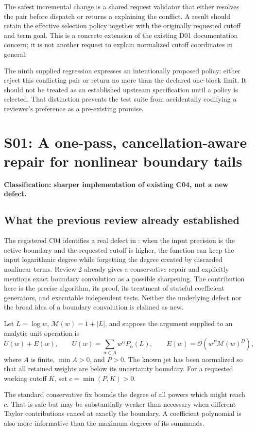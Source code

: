 \documentclass[11pt,a4paper]{article}
\newcommand{\code}[1]{\texttt{\detokenize{#1}}}
\newcommand{\OO}{\mathcal O}
\newcommand{\M}{\mathcal M}
\newcommand{\finding}[3]{\Needspace{7\baselineskip}\section{#1: #2}\textbf{Classification: #3.}\par}
\begin{document}
The safest incremental change is a shared request validator that either resolves the pair before dispatch or returns a \code{Failure} explaining the conflict. A result should retain the effective selection policy together with the originally requested cutoff and term goal. This is a concrete extension of the existing D01 documentation concern; it is not another request to explain normalized cutoff coordinates in general.

The ninth supplied regression expresses an intentionally proposed policy: either reject this conflicting pair or return no more than the declared one-block limit. It should not be treated as an established upstream specification until a policy is selected. That distinction prevents the test suite from accidentally codifying a reviewer's preference as a pre-existing promise.

\finding{S01}{A one-pass, cancellation-aware repair for nonlinear boundary tails}{sharper implementation of existing C04, not a new defect}

\subsection{What the previous review already established}
The registered C04 identifies a real defect in \code{unitSeriesPrecision}: when the input precision is the active boundary and the requested cutoff is higher, the function can keep the input logarithmic degree while forgetting the degree created by discarded nonlinear terms. Review 2 already gives a conservative repair and explicitly mentions exact boundary convolution as a possible sharpening. The contribution here is the precise algorithm, its proof, its treatment of stateful coefficient generators, and executable independent tests. Neither the underlying defect nor the broad idea of a boundary convolution is claimed as new.\cite{status,r2,main}

Let \(L=\log w\), \(\M(w)=1+|L|\), and suppose the argument supplied to an analytic unit operation is
\[
 U(w)+E(w),\qquad
 U(w)=\sum_{\alpha\in A}w^\alpha P_\alpha(L),\qquad
 E(w)=\OO(w^P\M(w)^D),
\]
where \(A\) is finite, \(\min A>0\), and \(P>0\). The known jet has been normalized so that all retained weights are below its uncertainty boundary. For a requested working cutoff \(K\), set \(c=\min(P,K)>0\).

The standard conservative fix bounds the degree of all powers which might reach \(c\). That is safe but may be substantially weaker than necessary when different Taylor contributions cancel at exactly the boundary. A coefficient polynomial is also more informative than the maximum degrees of its summands.
\end{document}

